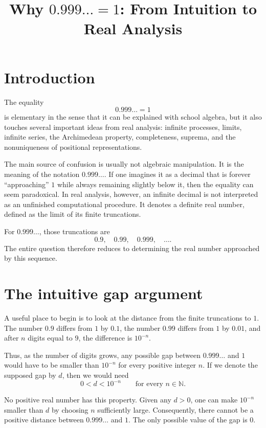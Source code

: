 \documentclass{essay}
\title{Why \(0.999\ldots = 1\): From Intuition to Real Analysis}
\author{}
\date{}
\begin{document}
\maketitle
\tableofcontents

\section{Introduction}

The equality
\[ 0.999\ldots = 1 \]
is elementary in the sense that it can be explained with school algebra, but it also touches several important ideas from real analysis: infinite processes, limits, infinite series, the Archimedean property, completeness, suprema, and the nonuniqueness of positional representations.

The main source of confusion is usually not algebraic manipulation. It is the meaning of the notation \(0.999\ldots\). If one imagines it as a decimal that is forever ``approaching'' \(1\) while always remaining slightly below it, then the equality can seem paradoxical. In real analysis, however, an infinite decimal is not interpreted as an unfinished computational procedure. It denotes a definite real number, defined as the limit of its finite truncations.

For \(0.999\ldots\), those truncations are
\[ 0.9,\quad 0.99,\quad 0.999,\quad \ldots. \]
The entire question therefore reduces to determining the real number approached by this sequence.

\section{The intuitive gap argument}

A useful place to begin is to look at the distance from the finite truncations to \(1\). The number \(0.9\) differs from \(1\) by \(0.1\), the number \(0.99\) differs from \(1\) by \(0.01\), and after \(n\) digits equal to \(9\), the difference is \(10^{-n}\).

Thus, as the number of digits grows, any possible gap between \(0.999\ldots\) and \(1\) would have to be smaller than \(10^{-n}\) for every positive integer \(n\). If we denote the supposed gap by \(d\), then we would need
\[ 0<d<10^{-n}\qquad\text{for every }n\in\mathbb{N}. \]

No positive real number has this property. Given any \(d>0\), one can make \(10^{-n}\) smaller than \(d\) by choosing \(n\) sufficiently large. Consequently, there cannot be a positive distance between \(0.999\ldots\) and \(1\). The only possible value of the gap is \(0\).
\end{document}
